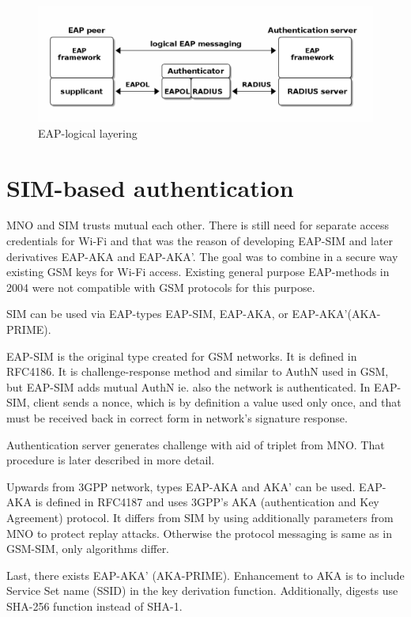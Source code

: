 \documentclass[12pt,a4paper,english]{tutthesis}
\begin{document}
\begin{otherlanguage}{english}
\begin{figure}[htb]
\centering
\includegraphics[width=.9\linewidth]{eap-layer.png}
\caption{\label{fig:eap-layers}EAP-logical layering}
\end{figure}






\section{SIM-based authentication}
\label{sec-2-5}

MNO and SIM trusts mutual each other.
There is still need for separate access credentials for Wi-Fi and
that was the reason of developing EAP-SIM and later derivatives
EAP-AKA and EAP-AKA'.
The goal was to combine in a secure way existing GSM keys for Wi-Fi
access. Existing general purpose EAP-methods in 2004 were not
compatible with GSM protocols for this purpose.\cite[p.93]{hav-doc}


SIM can be used via EAP-types EAP-SIM,
EAP-AKA, or EAP-AKA'(AKA-PRIME).

EAP-SIM is the original type created for GSM networks. It is defined 
in RFC4186\cite{rfc4186}.
It is challenge-response method and similar to AuthN used in GSM, 
but EAP-SIM adds mutual AuthN ie. also the network is authenticated.
In EAP-SIM, client sends a nonce, which is by definition a
value used only once, and that must be received back
in correct form in network's  signature response. 

Authentication server generates challenge with aid of
triplet from MNO.
That procedure is later described in more detail.

Upwards from 3GPP network, types EAP-AKA and AKA' can be used.
EAP-AKA is defined in RFC4187\cite{rfc4187} and
 uses 3GPP's AKA (authentication and Key Agreement) protocol.
It differs from SIM by using additionally parameters from MNO to
protect replay attacks. Otherwise the protocol messaging is same
as in  GSM-SIM, only algorithms differ.


Last, there exists EAP-AKA' (AKA-PRIME)\cite{rfc5448}.
Enhancement to AKA is to include Service Set name (SSID) 
in the key derivation function. Additionally, digests use SHA-256
function instead of SHA-1.



\end{otherlanguage}
\end{document}
